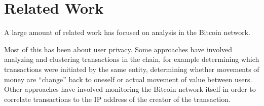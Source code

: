 \section{Related Work}

A large amount of related work has focused on analysis in the Bitcoin network. 

Most of this has been about user privacy. Some approaches have involved analyzing and clustering transactions in the chain, for example determining which transactions were initiated by the same entity, determining whether movements of money are ``change'' back to oneself or actual movement of value between users. Other approaches have involved monitoring the Bitcoin network itself in order to correlate transactions to the IP address of the creator of the transaction\cite{}.


